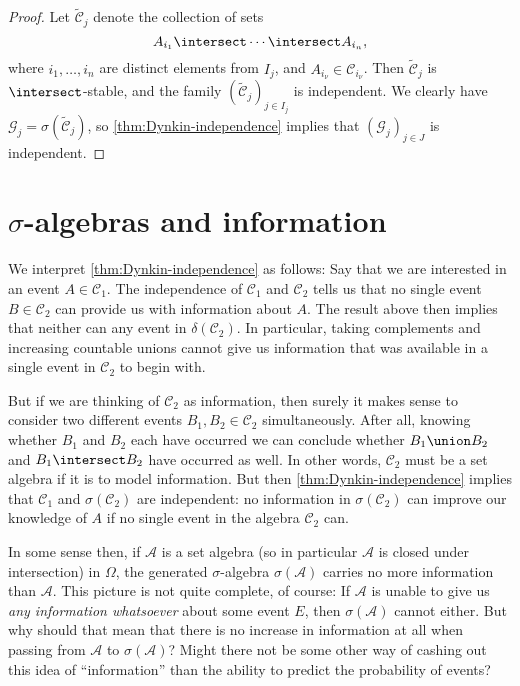 \documentclass[article, a4paper, 11pt, oneside]{memoir}
\numberwithin{equation}{chapter}
\newcommand{\calG}{\mathcal{G}}
\newcommand{\calA}{\mathcal{A}}
\newcommand{\calC}{\mathcal{C}}
\begin{document}
\begin{proof}
    Let $\tilde{\calC}_j$ denote the collection of sets
    \begin{equation*}
        A_{i_1} \intersect \cdots \intersect A_{i_n},
    \end{equation*}
    where $i_1, \ldots, i_n$ are distinct elements from $I_j$, and $A_{i_\nu} \in \calC_{i_\nu}$. Then $\tilde{\calC}_j$ is $\intersect$-stable, and the family $(\tilde{\calC}_j)_{j \in I_j}$ is independent. We clearly have $\calG_j = \sigma(\tilde{\calC}_j)$, so \cref{thm:Dynkin-independence} implies that $(\calG_j)_{j \in J}$ is independent.
\end{proof}


\section[Sigma-algebras and information][$\sigma$-algebras and information]{$\sigma$-algebras and information}

We interpret \cref{thm:Dynkin-independence} as follows: Say that we are interested in an event $A \in \calC_1$. The independence of $\calC_1$ and $\calC_2$ tells us that no single event $B \in \calC_2$ can provide us with information about $A$. The result above then implies that neither can any event in $\delta(\calC_2)$. In particular, taking complements and increasing countable unions cannot give us information that was available in a single event in $\calC_2$ to begin with.

But if we are thinking of $\calC_2$ as information, then surely it makes sense to consider two different events $B_1, B_2 \in \calC_2$ simultaneously. After all, knowing whether $B_1$ and $B_2$ each have occurred we can conclude whether $B_1 \union B_2$ and $B_1 \intersect B_2$ have occurred as well. In other words, $\calC_2$ must be a set algebra if it is to model information. But then \cref{thm:Dynkin-independence} implies that $\calC_1$ and $\sigma(\calC_2)$ are independent: no information in $\sigma(\calC_2)$ can improve our knowledge of $A$ if no single event in the algebra $\calC_2$ can.

In some sense then, if $\calA$ is a set algebra (so in particular $\calA$ is closed under intersection) in $\Omega$, the generated $\sigma$-algebra $\sigma(\calA)$ carries no more information than $\calA$. This picture is not quite complete, of course: If $\calA$ is unable to give us \emph{any information whatsoever} about some event $E$, then $\sigma(\calA)$ cannot either. But why should that mean that there is no increase in information at all when passing from $\calA$ to $\sigma(\calA)$? Might there not be some other way of cashing out this idea of \enquote{information} than the ability to predict the probability of events?
\end{document}

